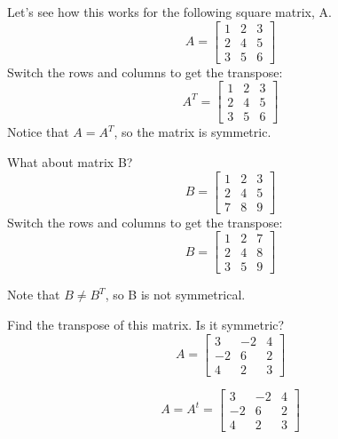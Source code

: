 Let's see how this works for the following square matrix, A.
$$
A = \begin{bmatrix}
1 & 2 & 3 \\
2 & 4 & 5 \\
3 & 5 & 6
\end{bmatrix}
$$
Switch the rows and columns to get the transpose:
$$
A^T = \begin{bmatrix}
1 & 2 & 3 \\
2 & 4 & 5 \\
3 & 5 & 6
\end{bmatrix}
$$
Notice that $A = A^T$, so the matrix is symmetric.

What about matrix B? 
$$
B = \begin{bmatrix}
1 & 2 & 3 \\
2 & 4 & 5 \\
7 & 8 & 9
\end{bmatrix}
$$
Switch the rows and columns to get the transpose:
$$
B = \begin{bmatrix}
1 & 2 & 7 \\
2 & 4 & 8 \\
3 & 5 & 9
\end{bmatrix}
$$

Note that $B \neq B^T$, so B is not symmetrical.

\begin{Exercise}[title={Matrix Transposition}, label=matrix-transpose01]
Find the transpose of this matrix. Is it symmetric? 
$$A = \begin{bmatrix}
 		3 & -2 &4  \\
 		-2 & 6 &2 \\
 		4 & 2 & 3 
	  \end{bmatrix}$$
\end{Exercise}
\begin{Answer}[ref=matrix-transpose01]
$$A =  A^t = 
	  \begin{bmatrix}
 		3 & -2 & 4  \\
 		-2 & 6 & 2 \\
 		4 & 2 & 3 
	\end{bmatrix}$$
\end{Answer}


